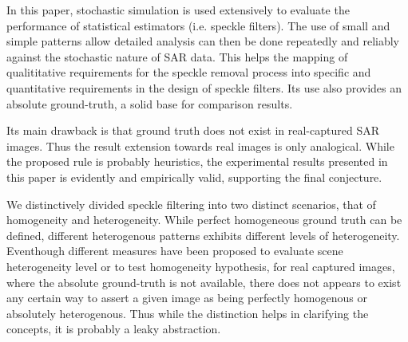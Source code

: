 \documentclass[journal]{IEEEtran}
\begin{document}
In this paper, stochastic simulation is used extensively to evaluate the performance of statistical estimators (i.e. speckle filters).
The use of small and simple patterns allow detailed analysis can then be done repeatedly and reliably against the stochastic nature of SAR data.%
This helps the mapping of qualititative requirements for the speckle removal process into specific and quantitative requirements in the design of speckle filters.
Its use also provides an absolute ground-truth, a solid base for comparison results.

Its main drawback is that ground truth does not exist in real-captured SAR images.%
Thus the result extension towards real images is only analogical.
While the proposed rule is probably heuristics, 
	the experimental results presented in this paper is evidently and empirically valid,
	supporting the final conjecture.

We distinctively divided speckle filtering into two distinct scenarios, that of homogeneity and heterogeneity.
While perfect homogeneous ground truth can be defined, 
	different heterogenous patterns exhibits different levels of heterogeneity. 
Eventhough different measures have been proposed to evaluate scene heterogeneity level or to test homogeneity hypothesis, 
	for real captured images, where the absolute ground-truth is not available, 
	there does not appears to exist any certain way to assert a given image as being perfectly homogenous or absolutely heterogenous.
Thus while the distinction helps in clarifying the concepts, 
	it is probably a leaky abstraction.
\end{document}
